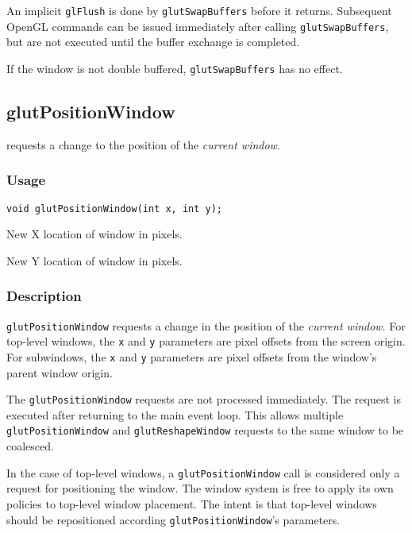 An implicit {\tt glFlush} is done by {\tt glutSwapBuffers} before it returns.
Subsequent OpenGL commands can be issued immediately after calling
{\tt glutSwapBuffers}, but are not executed until the buffer exchange
is completed.

If the window is not
double buffered, {\tt glutSwapBuffers} has no effect.

\subsection{glutPositionWindow}

 requests a change to the position of
the {\em current window}.

\subsubsection*{Usage}
\begin{verbatim}
void glutPositionWindow(int x, int y);
\end{verbatim}
\begin{description}
\itemsep 0in
\item[\tt x]
New X location of window in pixels.
\item[\tt y]
New Y location of window in pixels.
\end{description}

\subsubsection*{Description}

{\tt glutPositionWindow} requests a change in the position of
the {\em current window}.
For top-level windows, the {\tt x} and {\tt y} parameters are
pixel offsets from the screen origin.  For subwindows, the
{\tt x} and {\tt y} parameters are pixel offsets from the window's
parent window origin.

The {\tt glutPositionWindow} requests are not processed immediately.
The request is executed after returning to the main event loop.
This allows multiple {\tt glutPositionWindow} and {\tt glutReshapeWindow}
requests to the same window to be coalesced.

In the case of top-level windows, a {\tt glutPositionWindow} call
is considered only a request for positioning the window.
The window system is free to apply its own policies to top-level
window placement.  The intent is that top-level windows
should be repositioned according {\tt glutPositionWindow}'s parameters.

